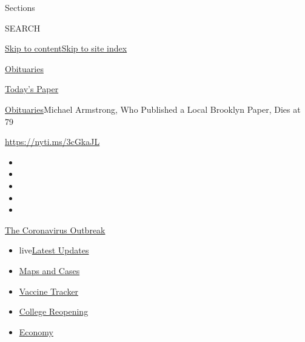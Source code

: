 Sections

SEARCH

\protect\hyperlink{site-content}{Skip to
content}\protect\hyperlink{site-index}{Skip to site index}

\href{https://www.nytimes.com/section/obituaries}{Obituaries}

\href{https://myaccount.nytimes.com/auth/login?response_type=cookie\&client_id=vi}{}

\href{https://www.nytimes.com/section/todayspaper}{Today's Paper}

\href{/section/obituaries}{Obituaries}\textbar{}Michael Armstrong, Who
Published a Local Brooklyn Paper, Dies at 79

\url{https://nyti.ms/3cGkaJL}

\begin{itemize}
\item
\item
\item
\item
\item
\end{itemize}

\href{https://www.nytimes.com/news-event/coronavirus?action=click\&pgtype=Article\&state=default\&region=TOP_BANNER\&context=storylines_menu}{The
Coronavirus Outbreak}

\begin{itemize}
\tightlist
\item
  live\href{https://www.nytimes.com/2020/08/03/world/coronavirus-covid-19.html?action=click\&pgtype=Article\&state=default\&region=TOP_BANNER\&context=storylines_menu}{Latest
  Updates}
\item
  \href{https://www.nytimes.com/interactive/2020/us/coronavirus-us-cases.html?action=click\&pgtype=Article\&state=default\&region=TOP_BANNER\&context=storylines_menu}{Maps
  and Cases}
\item
  \href{https://www.nytimes.com/interactive/2020/science/coronavirus-vaccine-tracker.html?action=click\&pgtype=Article\&state=default\&region=TOP_BANNER\&context=storylines_menu}{Vaccine
  Tracker}
\item
  \href{https://www.nytimes.com/2020/08/02/us/covid-college-reopening.html?action=click\&pgtype=Article\&state=default\&region=TOP_BANNER\&context=storylines_menu}{College
  Reopening}
\item
  \href{https://www.nytimes.com/live/2020/08/03/business/stock-market-today-coronavirus?action=click\&pgtype=Article\&state=default\&region=TOP_BANNER\&context=storylines_menu}{Economy}
\end{itemize}

